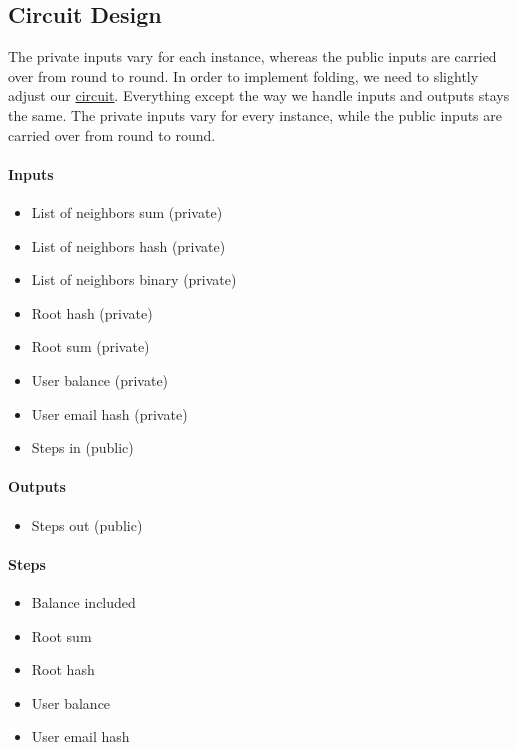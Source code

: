 \subsection{Circuit Design}
The private inputs vary for each instance, whereas the public inputs are carried over from round to round.
In order to implement folding, we need to slightly adjust our \hyperref[subsec:pi]{circuit}. Everything except the way we handle inputs and outputs stays the same.
The private inputs vary for every instance, while the public inputs are carried over from round to round.

\paragraph{Inputs}
\begin{itemize}

   \item List of neighbors sum (private)
   \item List of neighbors hash (private)
   \item List of neighbors binary (private)
   \item Root hash (private)
   \item Root sum (private)
   \item User balance (private)
   \item User email hash (private)
   \item Steps in (public)
  
   \end{itemize}

\paragraph{Outputs}
\begin{itemize}
   \item Steps out (public)
   \end{itemize}

\paragraph{Steps}
\begin{itemize}
   \item Balance included
   \item Root sum
   \item Root hash
   \item User balance
   \item User email hash
   \end{itemize}

